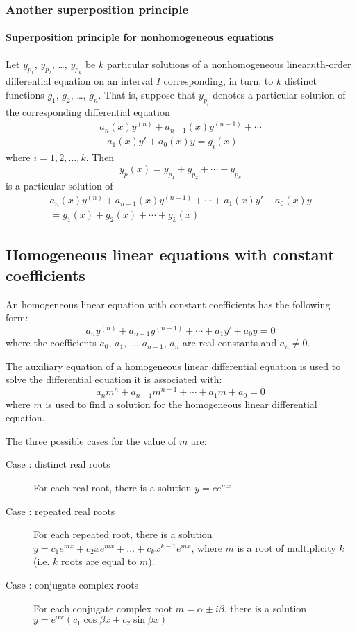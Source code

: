 \documentclass[10pt, twocolumn]{article}
\theoremstyle{definition}
\begin{document}
\subsubsection*{Another superposition principle}
\paragraph*{Superposition principle for nonhomogeneous equations}
Let \(y_{p_1 }\), \(y_{p_2 }\), \dots, \(y_{p_k }\) be \(k\) particular solutions of a nonhomogeneous linear\(n\)th-order differential equation on an interval \(I\) corresponding, in turn, to \(k\) distinct functions \(g_1 \), \(g_2 \), \dots, \(g_n \).
That is, suppose that \(y_{p_i }\) denotes a particular solution of the corresponding differential equation
\begin{multline*}
  a_n (x) y^{(n)} + a_{n - 1}(x) y^{(n - 1)} + \cdots \\
  + a_1 (x) y' + a_0 (x) y = g_i (x)
\end{multline*}
where \(i = 1, 2, \dots, k\).
Then
\[
  y_p (x) = y_{p_1 } + y_{p_2 } + \cdots + y_{p_k }
\]
is a particular solution of
\begin{multline*}
  a_n (x) y^{(n)} + a_{n - 1}(x) y^{(n - 1)} + \cdots + a_1 (x) y' + a_0 (x) y \\
  = g_1 (x) + g_2 (x) + \cdots + g_k (x)
\end{multline*}


\subsection{Homogeneous linear equations with constant coefficients}
An homogeneous linear equation with constant coefficients has the following form:
\[
  a_n y^{(n)} + a_{n - 1} y^{(n - 1)} + \cdots + a_1 y' + a_0 y = 0
\]
where the coefficients \(a_0 \), \(a_1 \), \dots, \(a_{n - 1}\), \(a_n \) are real constants and \(a_n \neq 0\).


The auxiliary equation of a homogeneous linear differential equation is used to solve the differential equation it is associated with:
\[
  a_n m^n + a_{n - 1}m^{n - 1} + \cdots + a_1 m + a_0 = 0
\]
where \(m\) is used to find a solution for the homogeneous linear differential equation.

The three possible cases for the value of \(m\) are:
\begin{description}
  \item[Case : distinct real roots] For each real root, there is a solution \(y = ce^{mx}\)
  \item[Case : repeated real roots] For each repeated root, there is a solution \(y = c_1 e^{mx} + c_2 xe^{mx} + \dots + c_k x^{k - 1}e^{mx}\), where \(m\) is a root of multiplicity \(k\) (i.e. \(k\) roots are equal to \(m\)).
  \item[Case : conjugate complex roots] For each conjugate complex root \(m = \alpha \pm i\beta\), there is a solution \(y = e^{\alpha x}(c_1 \cos{\beta x} + c_2 \sin{\beta x})\)
\end{description}
\end{document}
